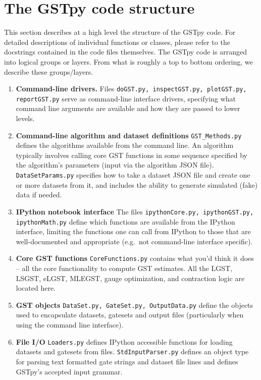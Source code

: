 \documentclass{article}[11pt]
\begin{document}
\section{The GSTpy code structure\label{secCodeStructure}}
This section describes at a high level the structure of the GSTpy code.  For detailed descriptions of individual functions or classes, please refer to the docstrings contained in the code files themselves.  The GSTpy code is arranged into logical groups or layers.  From what is roughly a top to bottom ordering, we describe these groups/layers.
\begin{enumerate}
\item \textbf{Command-line drivers.}  Files \texttt{doGST.py, inspectGST.py, plotGST.py, reportGST.py} serve as command-line interface drivers, specifying what command line arguments are available and how they are passed to lower levels.

\item \textbf{Command-line algorithm and dataset definitions} \texttt{GST\_Methods.py} defines the algorithms available from the command line.  An algorithm typically involves calling core GST functions in some sequence specified by the algorithm's parameters (input via the algorithm JSON file). \texttt{DataSetParams.py} specifies how to take a dataset JSON file and create one or more datasets from it, and includes the ability to generate simulated (fake) data if needed.

\item \textbf{IPython notebook interface} The files \texttt{ipythonCore.py, ipythonGST.py, ipythonMath.py} define which functions are available from the IPython interface, limiting the functions one can call from IPython to those that are well-documented and appropriate (e.g.~not command-line interface specific).

\item \textbf{Core GST functions} \texttt{CoreFunctions.py} contains what you'd think it does -- all the core functionality to compute GST estimates.  All the LGST, LSGST, eLGST, MLEGST, gauge optimization, and contraction logic are located here.

\item \textbf{GST objects} \texttt{DataSet.py, GateSet.py, OutputData.py} define the objects used to encapsulate datasets, gatesets and output files (particularly when using the command line interface).

\item \textbf{File I/O} \texttt{Loaders.py} defines IPython accessible functions for loading datasets and gatesets from files. \texttt{StdInputParser.py} defines an object type for parsing text formatted gate strings and dataset file lines and defines GSTpy's accepted input grammar.


\end{enumerate}
\end{document}
